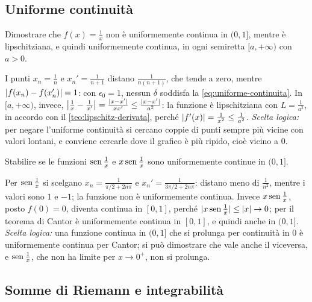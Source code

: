 \subsection*{Uniforme continuità}

\begin{esercizio}\label{es:uno-su-x-non-uniforme}
Dimostrare che $f(x)=\frac1x$ non è uniformemente continua in $(0,1]$, mentre è
lipschitziana, e quindi uniformemente continua, in ogni semiretta $[a,+\infty)$ con
$a>0$.
\begin{soluzione}
I punti $x_{n}=\frac1n$ e $x_{n}'=\frac1{n+1}$ distano $\frac1{n(n+1)}$, che tende a zero,
mentre $\lvert f(x_{n})-f(x_{n}')\rvert=1$: con $\epsilon_{0}=1$, nessun $\delta$ soddisfa la
\eqref{eq:uniforme-continuita}. In $[a,+\infty)$, invece,
$\bigl|\frac1x-\frac1{x'}\bigr|=\frac{\lvert x-x'\rvert}{xx'}\le\frac{\lvert x-x'\rvert}{a^{2}}$: la
funzione è lipschitziana con $L=\frac1{a^{2}}$, in accordo con il
\cref{teo:lipschitz-derivata}, perché $\lvert f'(x)\rvert=\frac1{x^{2}}\le\frac1{a^{2}}$.
\emph{Scelta logica:} per negare l'uniforme continuità si cercano coppie di punti
sempre più vicine con valori lontani, e conviene cercarle dove il grafico è più
ripido, cioè vicino a $0$.
\end{soluzione}
\end{esercizio}

\begin{esercizio}
Stabilire se le funzioni $\operatorname{sen}\frac1x$ e $x\operatorname{sen}\frac1x$ sono uniformemente continue in
$(0,1]$.
\begin{soluzione}
Per $\operatorname{sen}\frac1x$ si scelgano $x_{n}=\frac1{\pi/2+2n\pi}$ e $x_{n}'=\frac1{3\pi/2+2n\pi}$:
distano meno di $\frac1{n^{2}}$, mentre i valori sono $1$ e $-1$; la funzione non è
uniformemente continua. Invece $x\operatorname{sen}\frac1x$, posto $f(0)=0$, diventa continua in
$[0,1]$, perché $\lvert x\operatorname{sen}\frac1x\rvert\le\lvert x\rvert\to0$; per il teorema di Cantor è
uniformemente continua in $[0,1]$, e quindi anche in $(0,1]$. \emph{Scelta logica:} una
funzione continua in $(0,1]$ che si prolunga per continuità in $0$ è uniformemente
continua per Cantor; si può dimostrare che vale anche il viceversa, e $\operatorname{sen}\frac1x$,
che non ha limite per $x\to0^{+}$, non si prolunga.
\end{soluzione}
\end{esercizio}

\subsection*{Somme di Riemann e integrabilità}

